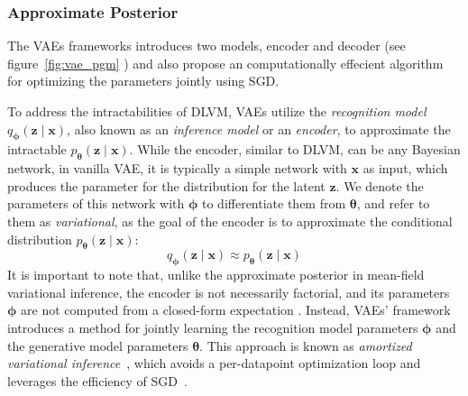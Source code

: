 \subsubsection{Approximate Posterior}
\label{subsubsec:vae_encoder}
The VAEs frameworks introduces two models, encoder and decoder (see figure~\ref{fig:vae_pgm} ) and also propose an computationally effecient algorithm for optimizing the parameters jointly
using SGD.

To address the intractabilities of DLVM, VAEs utilize the \textit{recognition model} $q_{\boldsymbol{\phi}}(\mathbf{z}\mid \mathbf{x})$, also known as an 
\textit{inference model} or an \textit{encoder}, to approximate the intractable $p_{\boldsymbol{\theta}}(\mathbf{z}\mid \mathbf{x})$. 
While the encoder, similar 
to DLVM, can be any Bayesian network, in vanilla VAE, it is typically a simple network with $\mathbf{x}$ as input, which produces the parameter for
the distribution for the latent $\mathbf{z}$. We denote the parameters of this network with ${\boldsymbol{\phi}}$ to differentiate them from ${\boldsymbol{\theta}}$, and refer
to them as \textit{variational}, as the goal of the encoder is to approximate the conditional distribution $p_{\boldsymbol{\theta}}(\mathbf{z}\mid \mathbf{x})$:
$$
q_{\boldsymbol{\phi}}(\mathbf{z}\mid \mathbf{x}) \approx p_{\boldsymbol{\theta}}(\mathbf{z}\mid \mathbf{x})
$$
It is important to note that, unlike the approximate posterior in mean-field variational inference, the encoder is not necessarily factorial, and
its parameters ${\boldsymbol{\phi}}$ are not computed from a closed-form expectation \cite{vae-original-2013}. Instead, VAEs' framework introduces a method for 
jointly learning the recognition model parameters ${\boldsymbol{\phi}}$ and the generative model parameters ${\boldsymbol{\theta}}$.  This approach is known as \textit{amortized 
variational inference}~\cite{amortized-inference-2014}, which avoids a per-datapoint optimization loop and leverages the efficiency of SGD~\cite{intro-vae-2019}.
